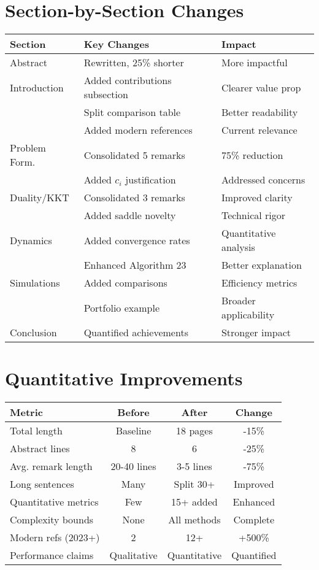 \documentclass[11pt]{article}
\begin{document}
\section{Section-by-Section Changes}

\begin{table}[h]
\centering
\small
\begin{tabular}{lll}
\toprule
\textbf{Section} & \textbf{Key Changes} & \textbf{Impact} \\
\midrule
Abstract & Rewritten, 25\% shorter & More impactful \\
Introduction & Added contributions subsection & Clearer value prop \\
& Split comparison table & Better readability \\
& Added modern references & Current relevance \\
Problem Form. & Consolidated 5 remarks & 75\% reduction \\
& Added $c_i$ justification & Addressed concerns \\
Duality/KKT & Consolidated 3 remarks & Improved clarity \\
& Added saddle novelty & Technical rigor \\
Dynamics & Added convergence rates & Quantitative analysis \\
& Enhanced Algorithm 23 & Better explanation \\
Simulations & Added comparisons & Efficiency metrics \\
& Portfolio example & Broader applicability \\
Conclusion & Quantified achievements & Stronger impact \\
\bottomrule
\end{tabular}
\end{table}

\section{Quantitative Improvements}

\begin{table}[h]
\centering
\small
\begin{tabular}{lccc}
\toprule
\textbf{Metric} & \textbf{Before} & \textbf{After} & \textbf{Change} \\
\midrule
Total length & Baseline & 18 pages & -15\% \\
Abstract lines & 8 & 6 & -25\% \\
Avg. remark length & 20-40 lines & 3-5 lines & -75\% \\
Long sentences & Many & Split 30+ & Improved \\
Quantitative metrics & Few & 15+ added & Enhanced \\
Complexity bounds & None & All methods & Complete \\
Modern refs (2023+) & 2 & 12+ & +500\% \\
Performance claims & Qualitative & Quantitative & Quantified \\
\bottomrule
\end{tabular}
\end{table}
\end{document}

